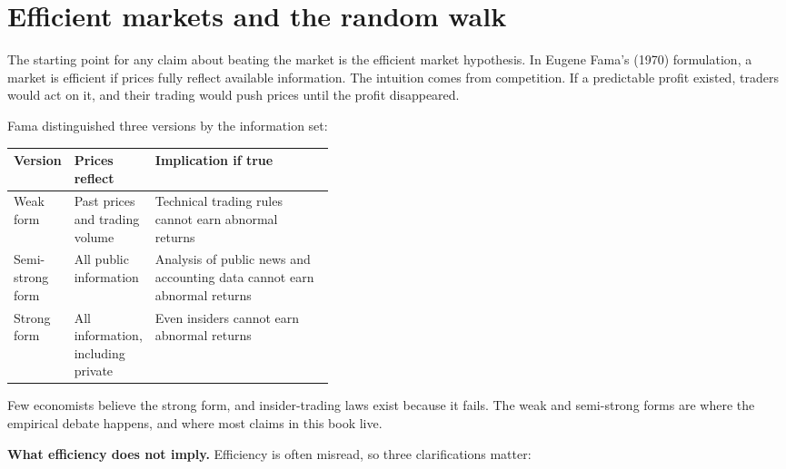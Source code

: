 \section{Efficient markets and the random walk}
\label{sec:01-efficient-markets}

The starting point for any claim about beating the market is the efficient market hypothesis. In Eugene Fama's (1970) formulation, a market is efficient if prices fully reflect available information. The intuition comes from competition. If a predictable profit existed, traders would act on it, and their trading would push prices until the profit disappeared.

Fama distinguished three versions by the information set:

\begin{center}
\small
\begin{tabularx}{0.9\linewidth}{@{}>{\raggedright\arraybackslash}p{0.180\linewidth}>{\raggedright\arraybackslash}p{0.234\linewidth}>{\raggedright\arraybackslash}X@{}}
\toprule
Version & Prices reflect & Implication if true \\
\midrule
Weak form & Past prices and trading volume & Technical trading rules cannot earn abnormal returns \\
Semi-strong form & All public information & Analysis of public news and accounting data cannot earn abnormal returns \\
Strong form & All information, including private & Even insiders cannot earn abnormal returns \\
\bottomrule
\end{tabularx}
\end{center}

Few economists believe the strong form, and insider-trading laws exist because it fails. The weak and semi-strong forms are where the empirical debate happens, and where most claims in this book live.

\textbf{What efficiency does not imply.} Efficiency is often misread, so three clarifications matter:

